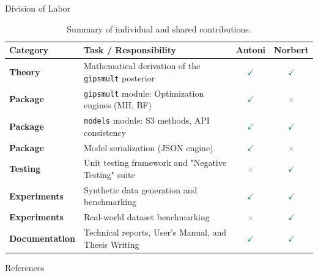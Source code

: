 \documentclass[aspectratio=169,xcolor=dvipsnames]{beamer}
\begin{document}
\begin{frame}{Division of Labor}
    \begin{table}[]
        \centering
        \small
        \renewcommand{\arraystretch}{1.1}
        
        \begin{tabularx}{\textwidth}{l X c c}
            \toprule
            \textbf{Category} & \textbf{Task / Responsibility} & \textbf{Antoni} & \textbf{Norbert} \\ 
            \midrule
            \textbf{Theory} & Mathematical derivation of the \texttt{gipsmult} posterior & \textcolor{teal}{$\checkmark$} & \textcolor{teal}{$\checkmark$} \\
            \addlinespace
            \textbf{Package} & \texttt{gipsmult} module: Optimization engines (MH, BF) & \textcolor{teal}{$\checkmark$} & \textcolor{gray}{$\times$} \\
            \addlinespace
            \textbf{Package} & \texttt{models} module: S3 methods, API consistency & \textcolor{teal}{$\checkmark$} & \textcolor{teal}{$\checkmark$} \\
            \addlinespace
            \textbf{Package} & Model serialization (JSON engine) & \textcolor{teal}{$\checkmark$} & \textcolor{gray}{$\times$} \\
            \addlinespace
            \textbf{Testing} & Unit testing framework and "Negative Testing" suite & \textcolor{gray}{$\times$} & \textcolor{teal}{$\checkmark$} \\
            \addlinespace
            \textbf{Experiments} & Synthetic data generation and benchmarking & \textcolor{teal}{$\checkmark$} & \textcolor{teal}{$\checkmark$} \\
            \addlinespace
            \textbf{Experiments} & Real-world dataset benchmarking & \textcolor{gray}{$\times$} & \textcolor{teal}{$\checkmark$} \\
            \addlinespace
            \textbf{Documentation} & Technical reports, User's Manual, and Thesis Writing & \textcolor{teal}{$\checkmark$} & \textcolor{teal}{$\checkmark$} \\
            \bottomrule
        \end{tabularx}
        \caption{Summary of individual and shared contributions.}
    \end{table}
\end{frame}

\begin{frame}{References}
    \tiny
    
    
\end{frame}

\end{document}
